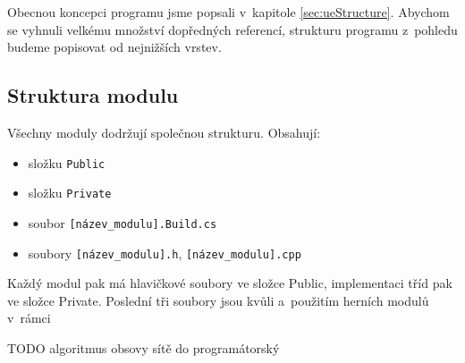 \FloatBarrier

Obecnou koncepci programu jsme popsali v~kapitole \ref{sec:ueStructure}. Abychom se vyhnuli velkému množství dopředných referencí, strukturu programu z~pohledu \CPP{} budeme popisovat od nejnižších vrstev.

\subsection{Struktura modulu}
Všechny moduly dodržují společnou strukturu. Obsahují:
\begin{itemize}
	\item složku \verb!Public!
	\item složku \verb!Private!
	\item soubor \verb![název_modulu].Build.cs!
	\item soubory \verb![název_modulu].h!, \verb![název_modulu].cpp!
\end{itemize}


Každý modul pak má hlavičkové soubory ve složce Public, implementaci tříd pak ve složce Private. Poslední tři soubory jsou kvůli \UBT{} a~použitím herních modulů v~rámci \UE{}













TODO algoritmus obsovy sítě do programátorský



